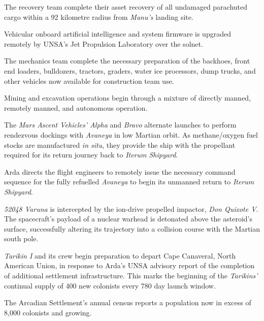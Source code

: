 The recovery team complete their asset recovery of all undamaged parachuted cargo within a 92 kilometre radius from {\it Manu's} landing site.
\StopTimelineDate

Vehicular onboard artificial intelligence and system firmware is upgraded remotely by UNSA's Jet Propulsion Laboratory over the solnet.

The mechanics team complete the necessary preparation of the backhoes, front end loaders, bulldozers, tractors, graders, water ice processors, dump trucks, and other vehicles now available for construction team use.

Mining and excavation operations begin through a mixture of directly manned, remotely manned, and autonomous operation.
\StopTimelineDate

The {\it Mars Ascent Vehicles' Alpha} and {\it Bravo} alternate launches to perform rendezvous dockings with {\it Avaneya} in low Martian orbit. As methane/oxygen fuel stocks are manufactured {\it in situ}, they provide the ship with the propellant required for its return journey back to {\it Iterum Shipyard}.
\StopTimelineDate

Arda directs the flight engineers to remotely issue the necessary command sequence for the fully refuelled {\it Avaneya} to begin its unmanned return to {\it Iterum Shipyard}.
\StopTimelineDate

{\it 52048 Varuna} is intercepted by the ion-drive propelled impactor, {\it Don Quixote V}. The spacecraft's payload of a nuclear warhead is detonated above the asteroid's surface, successfully altering its trajectory into a collision course with the Martian south pole.
\StopTimelineDate

{\it Tarikin I} and its crew begin preparation to depart Cape Canaveral, North American Union, in response to Arda's UNSA advisory report of the completion of additional settlement infrastructure. This marks the beginning of the {\it Tarikins'} continual supply of 400 new colonists every 780 day launch window.
\StopTimelineDate

The Arcadian Settlement's annual census reports a population now in excess of 8,000 colonists and growing.
\StopTimelineDate

